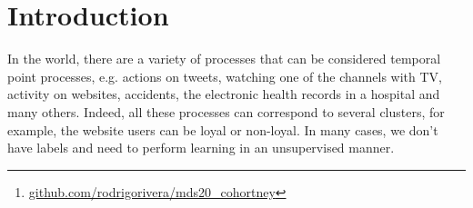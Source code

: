 \documentclass[10pt]{article}
\begin{document}
\printAffiliationsAndNotice{}  %
\begin{abstract}
Clustering temporal point processes is a challenging task due to the random nature of the point processes. There are a lot of methods for supervised and unsupervised classification of classical (synchronous) time-series. For asynchronous time-series or temporal point processes, there are almost no methods that exist right now. Dirichlet Hawkes Mixture Model allows to do unsupervised classification, however, this method is parametric. In this work, the novel Cohortney method has been taken and some different neural approaches have been used for clustering. That allowed to do non-parametric learning and achieve good results on both synthetic and real-data datasets. \footnote{\href{https://github.com/rodrigorivera/mds20\_cohortney}{github.com/rodrigorivera/mds20\_cohortney}}
\end{abstract}

\section{Introduction}\label{sec:intro}
In the world, there are a variety of processes that can be considered temporal point processes, e.g. actions on tweets, watching one of the channels with TV, activity on websites, accidents, the electronic health records in a hospital and many others. Indeed, all these processes can correspond to several clusters, for example, the website users can be loyal or non-loyal. In many cases, we don't have labels and need to perform learning in an unsupervised manner.
\end{document}
